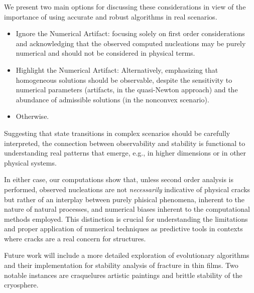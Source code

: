 We present two main options for discussing these considerations in view of the importance of using accurate and robust algorithms in real scenarios.

\begin{itemize}
    \item 
    Ignore the Numerical Artifact: focusing solely on first order considerations and acknowledging that the observed computed nucleations may be purely numerical and should not be considered in physical terms.
    \item 
    Highlight the Numerical Artifact: Alternatively, emphasizing that homogeneous solutions should be observable, despite 
    the sensitivity to numerical parameters (artifacts, in the quasi-Newton approach) and the abundance of admissible solutions (in the nonconvex scenario).
    \item 
    Otherwise.
\end{itemize}

Suggesting that state transitions in complex scenarios should be carefully interpreted, the connection between observability and stability is functional to understanding real patterns that emerge, e.g., in higher dimensions or in other physical systems.

In either case, our computations show that, unless second order analysis is performed, observed nucleations are not \emph{necessarily} indicative of physical cracks but rather of an interplay between purely phisical phenomena, inherent to the nature of natural processes, and numerical biases inherent to the computational methods employed. This distinction is crucial for understanding the limitations and proper application of numerical techniques as predictive tools in contexts where cracks are a real concern for structures.

Future work will include a more detailed exploration of evolutionary algorithms and their implementation for stability analysis of fracture in thin films. Two notable instances are craquelures artistic paintings and brittle stability of the cryosphere.



\clearpage



